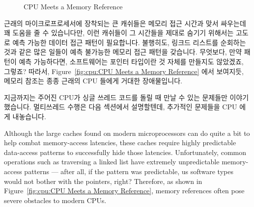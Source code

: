 \begin{figure}[htb]
\begin{center}
\end{center}
\caption{CPU Meets a Memory Reference}
\end{figure}

근래의 마이크로프로세서에 장착되는 큰 캐쉬들은 메모리 접근 시간과 맞서 싸우는데
꽤 도움을 줄 수 있습니다만, 이런 캐쉬들이 그 시간들을 제대로 숨기기 위해서는
고도로 예측 가능한 데이터 접근 패턴이 필요합니다.
불행히도, 링크드 리스트를 순회하는 것과 같은 많은 일들이 예측 불가능한 메모리
접근 패턴을 갖습니다. 무엇보다, 만약 패턴이 예측 가능하다면, 소프트웨어는
포인터 타입이란 것 자체를 만들지도 않았겠죠, 그렇죠?
따라서, Figure~\ref{fig:cpu:CPU Meets a Memory Reference} 에서 보여지듯, 메모리
참조는 종종 근래의 CPU 들에게 거대한 장애물입니다.

지금까지는 주어진 CPU가 싱글 쓰레드 코드를 돌릴 때 만날 수 있는 문제들만
이야기했습니다.
멀티쓰레드 수행은 다음 섹션에서 설명할텐데, 추가적인 문제들을 CPU 에게
내놓습니다.

\iffalse
Although the large caches found on modern microprocessors can do quite
a bit to help combat memory-access latencies,
these caches require highly predictable data-access patterns to
successfully hide those latencies.
Unfortunately, common operations such as traversing a linked list
have extremely unpredictable memory-access patterns --- after all,
if the pattern was predictable, us software types would not bother
with the pointers, right?
Therefore, as shown in
Figure~\ref{fig:cpu:CPU Meets a Memory Reference},
memory references often pose severe obstacles to modern CPUs.

